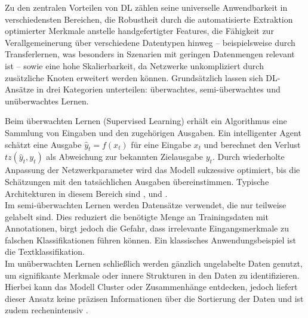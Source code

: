 Zu den zentralen Vorteilen von \acrshort{DL} zählen seine universelle Anwendbarkeit in verschiedensten Bereichen, die Robustheit durch die automatisierte Extraktion optimierter Merkmale anstelle handgefertigter Features, die Fähigkeit zur Verallgemeinerung über verschiedene Datentypen hinweg – beispielsweise durch Transferlernen, was besonders in Szenarien mit geringen Datenmengen relevant ist – sowie eine hohe Skalierbarkeit, da Netzwerke unkompliziert durch zusätzliche Knoten erweitert werden können. Grundsätzlich lassen sich DL-Ansätze in drei Kategorien unterteilen: überwachtes, semi-überwachtes und unüberwachtes Lernen\cite{Alzubaidi2021}.  

Beim überwachten Lernen (Supervised Learning) erhält ein Algorithmus eine Sammlung von Eingaben und den zugehörigen Ausgaben. Ein intelligenter Agent schätzt eine Ausgabe $\hat{y}_t = f(x_t)$ für eine Eingabe $x_t$ und berechnet den Verlust $tz(\hat{y}_t, y_t)$ als Abweichung zur bekannten Zielausgabe $y_t$. Durch wiederholte Anpassung der Netzwerkparameter wird das Modell sukzessive optimiert, bis die Schätzungen mit den tatsächlichen Ausgaben übereinstimmen. Typische Architekturen in diesem Bereich sind ,  und . \\ Im semi-überwachten Lernen werden Datensätze verwendet, die nur teilweise gelabelt sind. Dies reduziert die benötigte Menge an Trainingsdaten mit Annotationen, birgt jedoch die Gefahr, dass irrelevante Eingangsmerkmale zu falschen Klassifikationen führen können. Ein klassisches Anwendungsbeispiel ist die Textklassifikation. \\ Im unüberwachten Lernen schließlich werden gänzlich ungelabelte Daten genutzt, um signifikante Merkmale oder innere Strukturen in den Daten zu identifizieren. Hierbei kann das Modell Cluster oder Zusammenhänge entdecken, jedoch liefert dieser Ansatz keine präzisen Informationen über die Sortierung der Daten und ist zudem rechenintensiv \cite{Alzubaidi2021}.  

